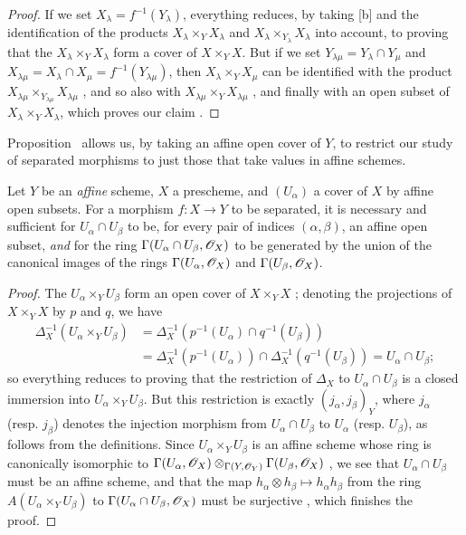\begin{proof}
\label{proof-1.5.5.5}
If we set $X_\lambda=f^{-1}(Y_\lambda)$, everything reduces, by taking [b] and the identification of the products $X_\lambda\times_Y X_\lambda$ and $X_\lambda\times_{Y_\lambda}X_\lambda$ into account, to proving that the $X_\lambda\times_Y X_\lambda$ form a cover of $X\times_Y X$.
But if we set $Y_{\lambda\mu}=Y_\lambda\cap Y_\mu$ and $X_{\lambda\mu}=X_\lambda\cap X_\mu=f^{-1}(Y_{\lambda\mu})$, then $X_\lambda\times_Y X_\mu$ can be identified with the product $X_{\lambda\mu}\times_{Y_{\lambda\mu}}X_{\lambda\mu}$ , and so also with $X_{\lambda\mu}\times_Y X_{\lambda\mu}$ , and finally with an open subset of $X_\lambda\times_Y X_\lambda$, which proves our claim .
\end{proof}

Proposition~ allows us, by taking an affine open cover of $Y$, to restrict our study of separated morphisms to just those that take values in affine schemes.

\begin{proposition}[5.5.6]
\label{1.5.5.6}
Let $Y$ be an \emph{affine} scheme, $X$ a prescheme, and $(U_\alpha)$ a cover of $X$ by affine open subsets.
For a morphism $f:X\to Y$ to be separated, it is necessary and sufficient for $U_\alpha\cap U_\beta$ to be, for every pair of indices $(\alpha,\beta)$, an affine open subset, \emph{and} for the ring $\Gamma(U_\alpha\cap U_\beta,\mathscr{O}_X)$ to be generated by the union of the canonical images of the rings $\Gamma(U_\alpha,\mathscr{O}_X)$ and $\Gamma(U_\beta,\mathscr{O}_X)$.
\end{proposition}

\begin{proof}
\label{proof-1.5.5.6}
The $U_\alpha\times_Y U_\beta$ form an open cover of $X\times_Y X$ ;
denoting the projections of $X\times_Y X$ by $p$ and $q$, we have
\begin{align*}
  \Delta_X^{-1}(U_\alpha\times_Y U_\beta)&=\Delta_X^{-1}(p^{-1}(U_\alpha)\cap q^{-1}(U_\beta))\\
                                         &=\Delta_X^{-1}(p^{-1}(U_\alpha))\cap\Delta_X^{-1}(q^{-1}(U_\beta))=U_\alpha\cap U_\beta;
\end{align*}
so everything reduces to proving that the restriction of $\Delta_X$ to $U_\alpha\cap U_\beta$ is a closed immersion into $U_\alpha\times_Y U_\beta$.
But this restriction is exactly $(j_\alpha,j_\beta)_Y$, where $j_\alpha$ (resp. $j_\beta$) denotes the injection morphism from $U_\alpha\cap U_\beta$ to $U_\alpha$ (resp. $U_\beta$), as follows from the definitions.
Since $U_\alpha\times_Y U_\beta$ is an affine scheme whose ring is canonically isomorphic to $\Gamma(U_\alpha,\mathscr{O}_X)\otimes_{\Gamma(Y,\mathscr{O}_Y)}\Gamma(U_\beta,\mathscr{O}_X)$ , we see that $U_\alpha\cap U_\beta$ must be an affine scheme, and that the map $h_\alpha\otimes h_\beta\mapsto h_\alpha h_\beta$ from the ring $A(U_\alpha\times_Y U_\beta)$ to $\Gamma(U_\alpha\cap U_\beta,\mathscr{O}_X)$ must be surjective , which finishes the proof.
\end{proof}

